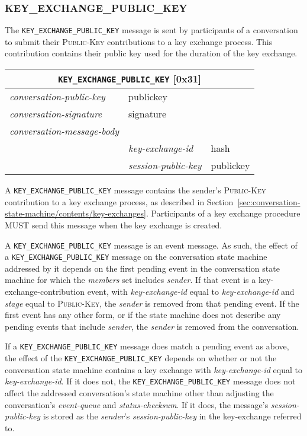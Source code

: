 \documentclass{article}
\def\npmessage#1{\texttt{#1}}
\def\field#1{\textit{#1}}
\def\smfield#1{\textsl{#1}}
\def\type#1{\textsf{#1}}
\newenvironment{conversationmessage}[2]{
\newcommand{\messagefield}[2]{
& \field{##1} & \type{##2} \\
\hline
}
\hspace{2em minus 2em}\begin{tabular}{|l|l|l|}
\hline
\multicolumn{3}{|c|}{\npmessage{#1} [#2]} \\
\hline
\hline
\field{conversation-public-key} & \multicolumn{2}{l|}{\type{publickey}} \\
\hline
\field{conversation-signature} & \multicolumn{2}{l|}{\type{signature}} \\
\hline
\field{conversation-message-body} & \multicolumn{2}{l|}{} \\
\hline
}{
\end{tabular}
}
\begin{document}
\subsubsection{KEY\_EXCHANGE\_PUBLIC\_KEY}
\label{sec:messages/key-exchange-public-key}

The \npmessage{KEY\_EXCHANGE\_PUBLIC\_KEY} message is sent by participants of a conversation to submit their \textsc{Public-Key} contributions to a key exchange process.
This contribution contains their public key used for the duration of the key exchange.

\begin{conversationmessage}{KEY\_EXCHANGE\_PUBLIC\_KEY}{0x31}
\messagefield{key-exchange-id}{hash}
\messagefield{session-public-key}{publickey}
\end{conversationmessage}

A \npmessage{KEY\_EXCHANGE\_PUBLIC\_KEY} message contains the sender's \textsc{Public-Key} contribution to a key exchange process, as described in Section~\ref{sec:conversation-state-machine/contents/key-exchanges}.
Participants of a key exchange procedure MUST send this message when the key exchange is created.

A \npmessage{KEY\_EXCHANGE\_PUBLIC\_KEY} message is an event message.
As such, the effect of a \npmessage{KEY\_EXCHANGE\_PUBLIC\_KEY} message on the conversation state machine addressed by it depends on the first pending event in the conversation state machine for which the \smfield{members} set includes \field{sender}.
If that event is a \type{key-exchange-contribution} event, with \smfield{key-exchange-id} equal to \field{key-exchange-id} and \smfield{stage} equal to \textsc{Public-Key}, the \field{sender} is removed from that pending event.
If the first event has any other form, or if the state machine does not describe any pending events that include \field{sender}, the \field{sender} is removed from the conversation.

If a \npmessage{KEY\_EXCHANGE\_PUBLIC\_KEY} message does match a pending event as above, the effect of the \npmessage{KEY\_EXCHANGE\_PUBLIC\_KEY} depends on whether or not the conversation state machine contains a key exchange with \smfield{key-exchange-id} equal to \field{key-exchange-id}.
If it does not, the \npmessage{KEY\_EXCHANGE\_PUBLIC\_KEY} message does not affect the addressed conversation's state machine other than adjusting the conversation's \smfield{event-queue} and \smfield{status-checksum}.
If it does, the message's \field{session-public-key} is stored as the \field{sender}'s \smfield{session-public-key} in the \type{key-exchange} referred to.
\end{document}
